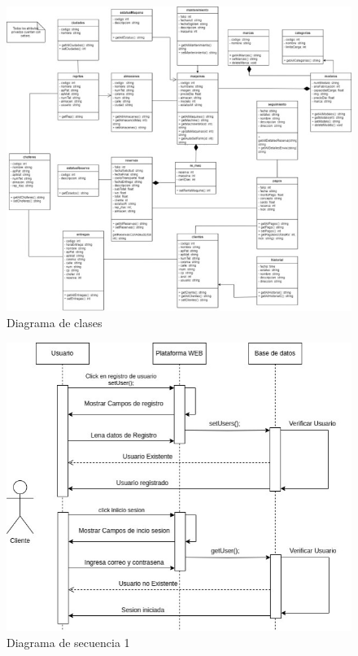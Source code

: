 \documentclass{article}
\begin{document}
\begin{figure}
    \centering
    \includegraphics[width=1.1\linewidth]{clases.jpg}
    \caption{Diagrama de clases}
    \label{fig:enter-label}
\end{figure}
\begin{figure}
    \centering
    \includegraphics[width=1.1\linewidth]{sec1.jpg}
    \caption{Diagrama de secuencia 1}
    \label{fig:enter-label}
\end{figure}
\end{document}
